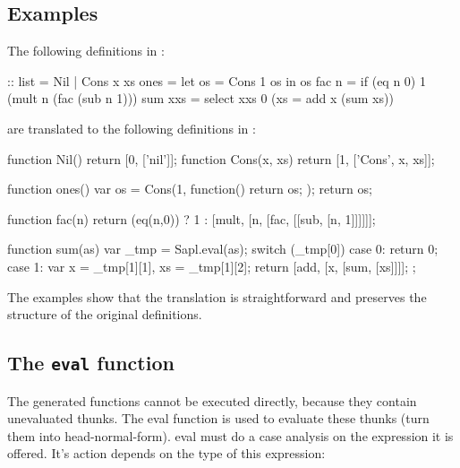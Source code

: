 \subsection{Examples}
The following definitions in \Sapl:
\begin{CleanCode}
:: list = Nil | Cons x xs	
ones = let os = Cons 1 os in os
fac n = if (eq n 0) 1 (mult n (fac (sub n 1)))
sum xxs = select xxs 0 (\x xs = add x (sum xs))
\end{CleanCode}
%
are translated to the following definitions in \JS:
\begin{CleanCode}
function Nil() { return [0, ['nil']]; }
function Cons(x, xs) { return [1, ['Cons', x, xs]]; }

function ones() { var os = Cons(1, function() { return os; }); return os; }

function fac(n) {
    return (eq(n,0)) ? 1 : [mult, [n, [fac, [[sub, [n, 1]]]]]];
}

function sum(as) {
	var _tmp = Sapl.eval(as);
	switch (_tmp[0]) {
		case 0: return 0;
		case 1: var x = _tmp[1][1], xs = _tmp[1][2]; 
				return [add, [x, [sum, [xs]]]];
	};
}

\end{CleanCode}
The examples show that the translation is straightforward and preserves the
structure of the original definitions.

\subsection{The \texttt{eval} function}
\label{eval}
The generated \JS functions cannot be executed directly, because they contain unevaluated thunks.
The \textsf{eval} function is used to evaluate these thunks (turn them into head-normal-form).
\textsf{eval} must do a case analysis on the expression it is offered.
It's action depends on the type of  this expression:


